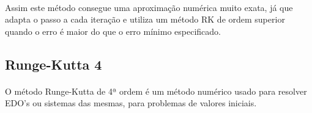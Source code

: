 \documentclass[a4paper, 11pt]{article}
\begin{document}
	\paragraph{}
	Assim este método consegue uma aproximação numérica muito exata, já que adapta o passo a cada iteração e utiliza um método RK de ordem superior quando o erro é maior do que o erro mínimo especificado.
	
	\subsection{Runge-Kutta 4}
	\paragraph{}
	O método Runge-Kutta de 4ª ordem é um método numérico usado para resolver EDO's ou sistemas das mesmas, para problemas de valores iniciais.
\end{document}
